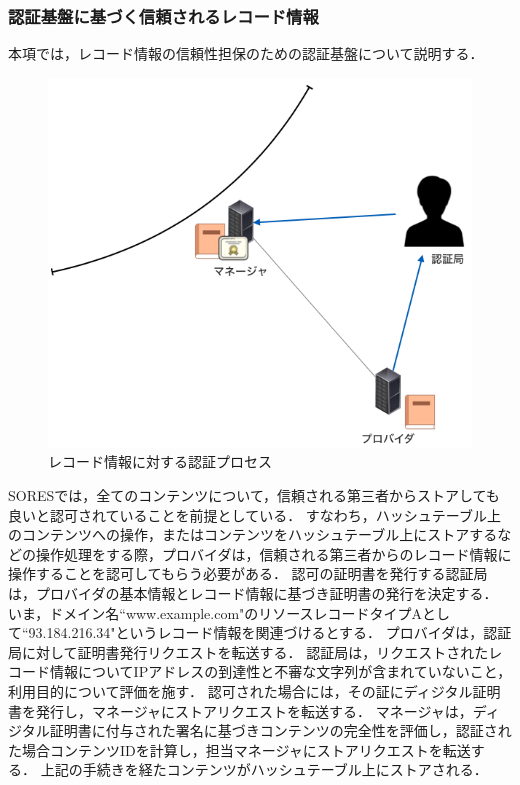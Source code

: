 \subsubsection{認証基盤に基づく信頼されるレコード情報}
\label{sec:certificate}
本項では，レコード情報の信頼性担保のための認証基盤について説明する．
\begin{figure}[h]
 \centering
 \includegraphics[scale=0.5]{figure/certificate-procedure.png}
 \caption{レコード情報に対する認証プロセス}
 \label{fig:manager-provider}
\end{figure}

SORESでは，全てのコンテンツについて，信頼される第三者からストアしても良いと認可されていることを前提としている．
すなわち，ハッシュテーブル上のコンテンツへの操作，またはコンテンツをハッシュテーブル上にストアするなどの操作処理をする際，プロバイダは，信頼される第三者からのレコード情報に操作することを認可してもらう必要がある．
認可の証明書を発行する認証局は，プロバイダの基本情報とレコード情報に基づき証明書の発行を決定する．
いま，ドメイン名``www.example.com"のリソースレコードタイプAとして``93.184.216.34"というレコード情報を関連づけるとする．
プロバイダは，認証局に対して証明書発行リクエストを転送する．
認証局は，リクエストされたレコード情報についてIPアドレスの到達性と不審な文字列が含まれていないこと，利用目的について評価を施す．
認可された場合には，その証にディジタル証明書を発行し，マネージャにストアリクエストを転送する．
マネージャは，ディジタル証明書に付与された署名に基づきコンテンツの完全性を評価し，認証された場合コンテンツIDを計算し，担当マネージャにストアリクエストを転送する．
上記の手続きを経たコンテンツがハッシュテーブル上にストアされる．


